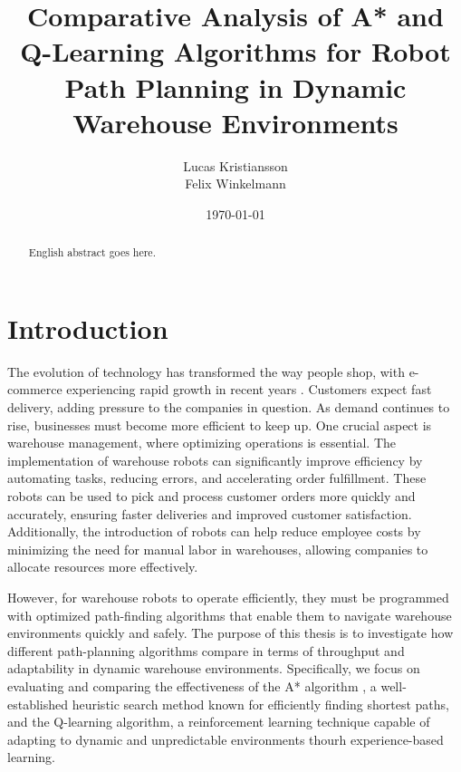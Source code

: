 \documentclass{kththesis}
\title{Comparative Analysis of A* and Q-Learning Algorithms for Robot Path Planning in Dynamic Warehouse Environments}
\author{Lucas Kristiansson\\Felix Winkelmann}
\date{\today}
\begin{document}
\frontmatter

\titlepage

\begin{abstract}
  English abstract goes here.

  
\end{abstract}


\begin{otherlanguage}{swedish}
  \begin{abstract}
    
  \end{abstract}
\end{otherlanguage}


\tableofcontents


\mainmatter

\chapter{Introduction}

The evolution of technology has transformed the way people shop, with e-commerce experiencing rapid growth in recent years \parencite{techtarget}. Customers expect fast delivery, adding pressure to the companies in question. As demand continues to rise, businesses must become more efficient to keep up. One crucial aspect is warehouse management, where optimizing operations is essential. The implementation of warehouse robots can significantly improve efficiency by automating tasks, reducing errors, and accelerating order fulfillment. These robots can be used to pick and process customer orders more quickly and accurately, ensuring faster deliveries and improved customer satisfaction. Additionally, the introduction of robots can help reduce employee costs by minimizing the need for manual labor in warehouses, allowing companies to allocate resources more effectively. 

However, for warehouse robots to operate efficiently, they must be programmed with optimized path-finding algorithms that enable them to navigate warehouse environments quickly and safely. The purpose of this thesis is to investigate how different path-planning algorithms compare in terms of throughput and adaptability in dynamic warehouse environments. Specifically, we focus on evaluating and comparing the effectiveness of the A* algorithm , a well-established heuristic search method known for efficiently finding shortest paths, and the Q-learning algorithm, a reinforcement learning technique capable of adapting to dynamic and unpredictable environments thourh experience-based learning. 
\end{document}

